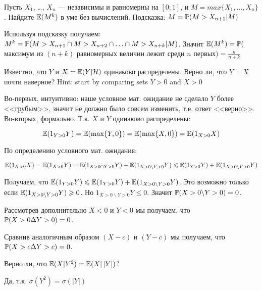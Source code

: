 \begin{problem}
Пусть $ X_{1} $, \ldots, $ X_{n} $ — независимы и равномерны на $ [0;1] $, и $ M=max\{X_{1},\ldots,X_{n}\} $. Найдите $\E(M^{k})$ в уме без вычислений. Подсказка: $ M=\P(M>X_{n+1}|M) $


\begin{sol}
Используя подсказку получаем: $ M^{k}=\P(M>X_{n+1} \cap M>X_{n+2} \cap \ldots \cap M>X_{n+k}|M) $. Значит $ \E(M^{k})=\P($максимум из $ (n+k) $ равномерных величин лежит среди $ n $ первых$)=\frac{n}{n+k} $
\end{sol}
\end{problem}

\begin{problem}
Известно, что $ Y $ и $ X=\E(Y|\mathcal{H}) $ одинаково распределены. Верно ли, что $ Y=X $ почти наверное? Hint: start by comparing sets $ Y>0 $ and $ X>0 $

\begin{sol}
Во-первых, интуитивно: наше условное мат. ожидание не сделало $ Y $ более <<грубым>>, значит не должно было совсем изменить, т.е. ответ <<верно>>. Во-вторых, формально. Т.к. $ X $ и $ Y $ одинаково распределены:

\[ \E(1_{Y>0}Y)=\E(\max\{Y,0\})=\E(\max\{X,0\})=\E(1_{X>0}X) \]

По определению условного мат. ожидания:

\[ \E(1_{X>0}X)=\E(1_{X>0}Y)=\E(1_{X>0\cap Y>0} Y)+\E(1_{X>0\backslash Y>0} Y)\leq \E(1_{ Y>0} Y)+\E(1_{X>0\backslash Y>0} Y)\]

Получаем, что $ \E(1_{Y>0}Y) \leq \E(1_{ Y>0} Y)+\E(1_{X>0\backslash Y>0} Y) $. Это возможно только если $ \E(1_{X>0\backslash Y>0} Y)\geq 0 $. Но $ 1_{X>0\backslash Y>0} Y \leq 0$. Значит $ \P(X>0 \backslash Y>0)=0 $.

Рассмотрев дополнительно $ X<0 $ и $ Y<0 $ мы получаем, что $ \P(X>0 \Delta Y>0)=0 $.

Сравнив аналогичным образом $ (X-c) $ и $ (Y-c) $ мы получаем, что $ \P(X>c \Delta Y>c)=0 $.


\end{sol}
\end{problem}

\begin{problem}
Верно ли, что $\E(X|Y^{2})=\E(X|\,|Y|)$?

\begin{sol}
Да, т.к. $\sigma(Y^{2})=\sigma(|Y|)$
\end{sol}
\end{problem}

